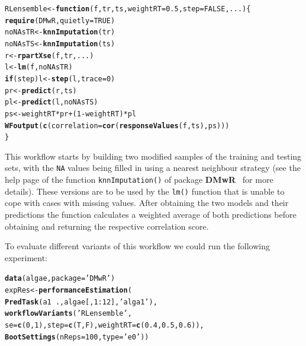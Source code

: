 \documentclass[10pt,a4paper]{article}\usepackage[]{graphicx}\usepackage[]{color}
\makeatletter
\newcommand{\hlnum}[1]{\textcolor[rgb]{0.686,0.059,0.569}{#1}}%
\newcommand{\hlstr}[1]{\textcolor[rgb]{0.192,0.494,0.8}{#1}}%
\newcommand{\hlopt}[1]{\textcolor[rgb]{0,0,0}{#1}}%
\newcommand{\hlstd}[1]{\textcolor[rgb]{0.345,0.345,0.345}{#1}}%
\newcommand{\hlkwa}[1]{\textcolor[rgb]{0.161,0.373,0.58}{\textbf{#1}}}%
\newcommand{\hlkwb}[1]{\textcolor[rgb]{0.69,0.353,0.396}{#1}}%
\newcommand{\hlkwc}[1]{\textcolor[rgb]{0.333,0.667,0.333}{#1}}%
\newcommand{\hlkwd}[1]{\textcolor[rgb]{0.737,0.353,0.396}{\textbf{#1}}}%
\newenvironment{kframe}{%
 \def\at@end@of@kframe{}%
 \ifinner\ifhmode%
  \def\at@end@of@kframe{\end{minipage}}%
  \begin{minipage}{\columnwidth}%
 \fi\fi%
 \def\FrameCommand##1{\hskip\@totalleftmargin \hskip-\fboxsep
 \colorbox{shadecolor}{##1}\hskip-\fboxsep
     \hskip-\linewidth \hskip-\@totalleftmargin \hskip\columnwidth}%
 \MakeFramed {\advance\hsize-\width
   \@totalleftmargin\z@ \linewidth\hsize
   \@setminipage}}%
 {\par\unskip\endMakeFramed%
 \at@end@of@kframe}
\newenvironment{knitrout}{}{} %
\makeatother
\begin{document}
\begin{knitrout}
\color{fgcolor}\begin{kframe}
\begin{alltt}
\hlstd{RLensemble} \hlkwb{<-} \hlkwa{function}\hlstd{(}\hlkwc{f}\hlstd{,}\hlkwc{tr}\hlstd{,}\hlkwc{ts}\hlstd{,}\hlkwc{weightRT}\hlstd{=}\hlnum{0.5}\hlstd{,}\hlkwc{step}\hlstd{=}\hlnum{FALSE}\hlstd{,}\hlkwc{...}\hlstd{) \{}
  \hlkwd{require}\hlstd{(DMwR,}\hlkwc{quietly}\hlstd{=}\hlnum{TRUE}\hlstd{)}
  \hlstd{noNAsTR} \hlkwb{<-} \hlkwd{knnImputation}\hlstd{(tr)}
  \hlstd{noNAsTS} \hlkwb{<-} \hlkwd{knnImputation}\hlstd{(ts)}
  \hlstd{r} \hlkwb{<-} \hlkwd{rpartXse}\hlstd{(f,tr,...)}
  \hlstd{l} \hlkwb{<-} \hlkwd{lm}\hlstd{(f,noNAsTR)}
  \hlkwa{if} \hlstd{(step) l} \hlkwb{<-} \hlkwd{step}\hlstd{(l,}\hlkwc{trace}\hlstd{=}\hlnum{0}\hlstd{)}
  \hlstd{pr} \hlkwb{<-} \hlkwd{predict}\hlstd{(r,ts)}
  \hlstd{pl} \hlkwb{<-} \hlkwd{predict}\hlstd{(l,noNAsTS)}
  \hlstd{ps} \hlkwb{<-} \hlstd{weightRT}\hlopt{*}\hlstd{pr}\hlopt{+}\hlstd{(}\hlnum{1}\hlopt{-}\hlstd{weightRT)}\hlopt{*}\hlstd{pl}
  \hlkwd{WFoutput}\hlstd{(}\hlkwd{c}\hlstd{(}\hlkwc{correlation}\hlstd{=}\hlkwd{cor}\hlstd{(}\hlkwd{responseValues}\hlstd{(f,ts),ps)))}
\hlstd{\}}
\end{alltt}
\end{kframe}
\end{knitrout}


This workflow starts by building two modified samples of the training
and testing sets, with the \texttt{NA} values being filled in using a
nearest neighbour strategy (see the help page of the function
\texttt{knnImputation()} of package \textbf{DMwR}~\cite{Tor10} for more
details). These versions are to be used by the \texttt{lm()} function
that is unable to cope with cases with missing values. After obtaining
the two models and their predictions the function calculates a
weighted average of both predictions before obtaining and returning
the respective correlation score.

To evaluate different variants of this workflow we could run the
following experiment:

\begin{knitrout}
\color{fgcolor}\begin{kframe}
\begin{alltt}
\hlkwd{data}\hlstd{(algae,}\hlkwc{package}\hlstd{=}\hlstr{'DMwR'}\hlstd{)}
\hlstd{expRes} \hlkwb{<-} \hlkwd{performanceEstimation}\hlstd{(}
  \hlkwd{PredTask}\hlstd{(a1} \hlopt{~} \hlstd{.,algae[,}\hlnum{1}\hlopt{:}\hlnum{12}\hlstd{],}\hlstr{'alga1'}\hlstd{),}
  \hlkwd{workflowVariants}\hlstd{(}\hlstr{'RLensemble'}\hlstd{,}
                  \hlkwc{se}\hlstd{=}\hlkwd{c}\hlstd{(}\hlnum{0}\hlstd{,}\hlnum{1}\hlstd{),}\hlkwc{step}\hlstd{=}\hlkwd{c}\hlstd{(T,F),}\hlkwc{weightRT}\hlstd{=}\hlkwd{c}\hlstd{(}\hlnum{0.4}\hlstd{,}\hlnum{0.5}\hlstd{,}\hlnum{0.6}\hlstd{)),}
  \hlkwd{BootSettings}\hlstd{(}\hlkwc{nReps}\hlstd{=}\hlnum{100}\hlstd{,}\hlkwc{type}\hlstd{=}\hlstr{'e0'}\hlstd{))}
\end{alltt}
\end{kframe}
\end{knitrout}
\end{document}
